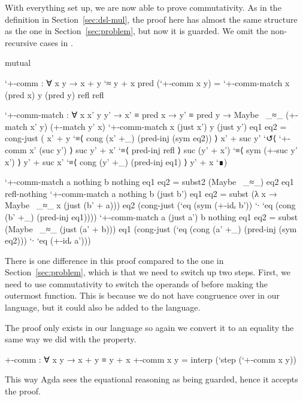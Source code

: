 With everything set up, we are now able to prove commutativity. As in the
definition in Section~\ref{sec:dsl-mul}, the proof here has almost the same
structure as the one in Section~\ref{sec:problem}, but now it is guarded. We
omit the non-recursive cases in .
\begin{code}[hide]
mutual
\end{code}
\begin{code}
  `+-comm : ∀ x y → x + y `≈ y + x
  pred (`+-comm x y) =
    `+-comm-match x (pred x) y (pred y) refl refl

  `+-comm-match :
    ∀ x x' y y' → x' ≡ pred x → y' ≡ pred y →
    Maybe~ _≈_ (+-match x' y) (+-match y' x)
  `+-comm-match x (just x') y (just y') eq1 eq2 =
    cong-just
      ( x' + y         `≡⟨ cong (x' +_) (pred-inj (sym eq2)) ⟩
        x' + suc y'    `↺⟨ `+-comm x' (suc y') ⟩
        suc y' + x'    `≡⟨ pred-inj refl ⟩
        suc (y' + x')  `≡⟨ sym (+-suc y' x') ⟩
        y' + suc x'    `≡⟨ cong (y' +_) (pred-inj eq1) ⟩
        y' + x         `∎)
\end{code}
\begin{code}[hide]
  `+-comm-match a nothing b nothing eq1 eq2 = subst2 (Maybe~ _≈_) eq2 eq1 refl-nothing
  `+-comm-match a nothing b (just b') eq1 eq2 = subst (λ x → Maybe~ _≈_ x (just (b' + a))) eq2 (cong-just (`eq (sym (+-idᵣ b')) `∙ `eq (cong (b' +_) (pred-inj eq1))))
  `+-comm-match a (just a') b nothing eq1 eq2 = subst (Maybe~ _≈_ (just (a' + b))) eq1 (cong-just (`eq (cong (a' +_) (pred-inj (sym eq2))) `∙ `eq (+-idᵣ a')))
\end{code}
There is one difference in this proof compared to the one in
Section~\ref{sec:problem}, which is that we need to switch up two steps. First,
we need to use commutativity to switch the operands of \AgdaFunction{\_+\_}
before making  the outermost function. This is because we do
not have congruence over  in our language, but it could also
be added to the language.

The proof only exists in our language so again we convert it to an equality the
same way we did with the  property.
\begin{code}
+-comm : ∀ x y → x + y ≡ y + x
+-comm x y = interp (`step (`+-comm x y))
\end{code}
This way Agda sees the equational reasoning as being guarded, hence it accepts
the proof.
